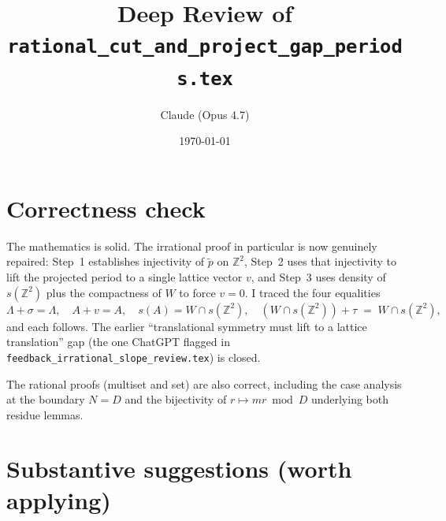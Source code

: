 \documentclass[11pt]{article}
\title{Deep Review of\\
\large \texttt{rational\_cut\_and\_project\_gap\_periods.tex}}
\author{Claude (Opus 4.7)}
\date{\today}
\begin{document}
\maketitle

\section*{Correctness check}

The mathematics is solid.  The irrational proof in particular is now
genuinely repaired: Step~1 establishes injectivity of \(\tilde p\) on
\(\mathbb{Z}^2\), Step~2 uses that injectivity to lift the projected
period to a single lattice vector \(v\), and Step~3 uses density of
\(s(\mathbb{Z}^2)\) plus the compactness of \(W\) to force \(v=0\).  I
traced the four equalities
\[
    \Lambda+\sigma=\Lambda,
    \quad
    A+v=A,
    \quad
    s(A)=W\cap s(\mathbb{Z}^2),
    \quad
    (W\cap s(\mathbb{Z}^2))+\tau \;=\; W\cap s(\mathbb{Z}^2),
\]
and each follows.  The earlier ``translational symmetry must lift to a
lattice translation'' gap (the one ChatGPT flagged in
\texttt{feedback\_irrational\_slope\_review.tex}) is closed.

The rational proofs (multiset and set) are also correct, including the
case analysis at the boundary \(N=D\) and the bijectivity of
\(r\mapsto mr\bmod D\) underlying both residue lemmas.

\section*{Substantive suggestions (worth applying)}
\end{document}
